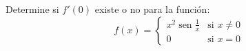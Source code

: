 \item Determine si $f'(0)$ existe o no para la función:
$$f(x) = \begin{cases} 
x^2 \operatorname{sen} \frac{1}{x} & \text{si } x \ne 0 \\ 
0 & \text{si } x = 0 
\end{cases}$$
